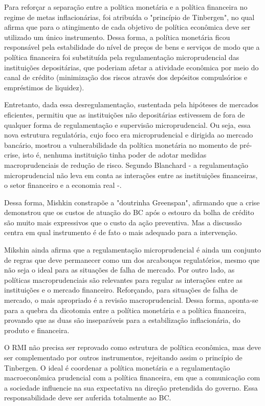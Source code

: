 \documentclass[report]{uftex}
\begin{document}
Para reforçar a separação entre a política monetária e a política financeira no regime de metas inflacionárias, foi atribuída o "princípio de Tinbergen", no qual afirma que para o atingimento de cada objetivo de política econômica deve ser utilizado um único instrumento. Dessa forma, a política monetária ficou responsável pela estabilidade do nível de preços de bens e serviços de modo que a política financeira foi substituída pela regulamentação microprudencial das instituições depositárias, que poderiam afetar a atividade econômica por meio do canal de crédito (minimização dos riscos através dos depósitos compulsórios e empréstimos de liquidez). 

Entretanto, dada essa desregulamentação, sustentada pela hipóteses de mercados eficientes, permitiu que as instituições não depositárias estivessem de fora de qualquer forma de regulamentação e supervisão microprudencial. Ou seja, essa nova estrutura regulatória, cujo foco era microprudencial e dirigida ao mercado bancário, mostrou a vulnerabilidade da política monetária no momento de pré-crise, isto é, nenhuma instituição tinha poder de adotar medidas macroprudenciais de redução de risco. Segundo Blanchard - a regulamentação microprudencial não leva em conta as interações entre as instituições financeiras, o setor financeiro e a economia real -.

Dessa forma, Mishkin constrapõe a "doutrinha Greenspan", afirmando que a crise demonstrou que os custos de atuação do BC após o estouro da bolha de crédito são muito mais expressivos que o custo da ação preventiva. Mas a discussão centra em qual instrumento é de fato o mais adequado para a intervenção. 

Mikshin ainda afirma que a regulamentação microprudencial é ainda um conjunto de regras que deve permanecer como um dos arcabouços regulatórios, mesmo que não seja o ideal para as situações de falha de mercado. Por outro lado, as políticas macroprudenciais são relevantes para regular as interações entre as instituições e o mercado financeiro. Reforçando, para situações de falha de mercado, o mais apropriado é a revisão macroprudencial. Dessa forma, aponta-se para a quebra da dicotomia entre a política monetária e a política financeira, provando que as duas são inseparáveis para a estabilização inflacionária, do produto e financeira. 

 
O RMI não precisa ser reprovado como estrutura de política econômica, mas deve ser complementado por outros instrumentos, rejeitando assim o princípio de Tinbergen. O ideal é coordenar a política monetária e a regulamentação macroeconômica prudencial com a política financeira, em que a comunicação com a sociedade influencie na sua expectativa na direção pretendida do governo. Essa responsabilidade deve ser auferida totalmente ao BC. 
\end{document}
